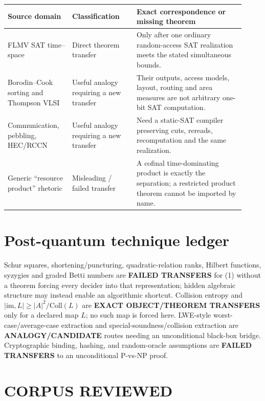 \documentclass[11pt]{article}
\begin{document}
\begin{center}\small
\begin{tabular}{@{}p{0.25\linewidth}p{0.25\linewidth}p{0.42\linewidth}@{}}
\toprule
Source domain & Classification & Exact correspondence or missing theorem\\ \midrule
FLMV SAT time--space & Direct theorem transfer & Only after one ordinary random-access SAT realization meets the stated simultaneous bounds.\\
Borodin--Cook sorting and Thompson VLSI & Useful analogy requiring a new transfer & Their outputs, access models, layout, routing and area measures are not arbitrary one-bit SAT computation.\\
Communication, pebbling, HEC/RCCN & Useful analogy requiring a new transfer & Need a static-SAT compiler preserving cuts, rereads, recomputation and the same realization.\\
Generic ``resource product'' rhetoric & Misleading / failed transfer & A cofinal time-dominating product is exactly the separation; a restricted product theorem cannot be imported by name.\\
\bottomrule
\end{tabular}
\end{center}

\section{Post-quantum technique ledger}

Schur squares, shortening/puncturing, quadratic-relation ranks, Hilbert
functions, syzygies and graded Betti numbers are \textbf{FAILED TRANSFERS} for
(1) without a theorem forcing every decider into that representation; hidden
algebraic structure may instead enable an algorithmic shortcut.  Collision
entropy and $|\mathrm{im},L|\ge |A|^2/\mathrm{Coll}(L)$ are
\textbf{EXACT OBJECT/THEOREM TRANSFERS} only for a declared map $L$; no such
map is forced here.  LWE-style worst-case/average-case extraction and
special-soundness/collision extraction are \textbf{ANALOGY/CANDIDATE} routes
needing an unconditional black-box bridge.  Cryptographic binding, hashing,
and random-oracle assumptions are \textbf{FAILED TRANSFERS} to an
unconditional P-vs-NP proof.

\section{CORPUS REVIEWED}
\end{document}
